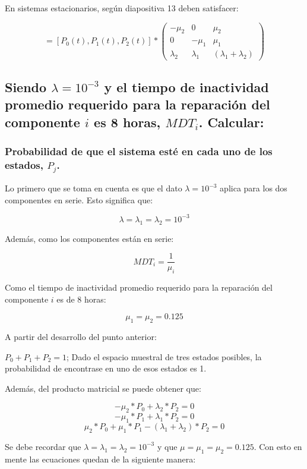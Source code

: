 \documentclass[
    11pt,
    spanish,
    a4paper
]{article}
\begin{document}
En sistemas estacionarios, según diapositiva 13 deben satisfacer:

\begin{equation}
	[0,0,0] = [P_0(t),P_1(t),P_2(t)] *
	\begin{pmatrix}
		-\mu_2    & 0         & \mu_2                   \\
		0         & -\mu_1    & \mu_1                   \\
		\lambda_2 & \lambda_1 & (\lambda_1 + \lambda_2)
	\end{pmatrix}
\end{equation}

\subsection{Siendo $ \lambda=10^{-3} $ y el tiempo de inactividad promedio requerido para la reparación del componente $ i $ es 8 horas, $ MDT_i $. Calcular:}


\subsubsection{Probabilidad de que el sistema esté en cada uno de los estados, $ P_j $.}

Lo primero que se toma en cuenta es que el dato $ \lambda=10^{-3} $ aplica para los dos componentes en serie.
Esto significa que:

$$ \lambda=\lambda_1=\lambda_2=10^{-3} $$

Además, como los componentes están en serie:

$$ MDT_i = \frac{1}{\mu_i} $$

Como el tiempo de inactividad promedio requerido para la reparación del componente $ i $ es de 8 horas:

$$ \mu_1 = \mu_2 = 0.125 $$

A partir del desarrollo del punto anterior:

$ P_0 + P_1 + P_2 = 1 $; Dado el espacio muestral de tres estados posibles, la probabilidad de encontrase en uno de esos estados es 1.

Además, del producto matricial se puede obtener que:

$$ -\mu_2 * P_0 + \lambda_2 * P_2 = 0 $$
$$ -\mu_1 * P_1  + \lambda_1 * P_2 = 0 $$
$$  \mu_2 * P_0 + \mu_1 * P_1 - (\lambda_1 + \lambda_2) * P_2 = 0 $$

Se debe recordar que $ \lambda=\lambda_1=\lambda_2=10^{-3} $ y que $ \mu = \mu_1 = \mu_2 = 0.125 $.
Con esto en mente las ecuaciones quedan de la siguiente manera:
\end{document}
